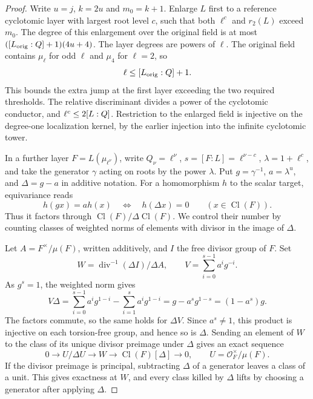\begin{proof}

Write \(u=j\), \(k=2u\) and \(m_0=k+1\).
Enlarge \(L\) first to a reference cyclotomic layer with largest
root level \(c\), such that both \(\ell^c\) and \(r_2(L)\)
exceed \(m_0\). The degree of this enlargement over the
original field is at most \(([L_{\rm orig}:Q]+1)(4u+4)\).
The layer degrees are powers of \(\ell\). The original field
contains \(\mu_\ell\) for odd \(\ell\) and \(\mu_4\) for \(\ell=2\),
so
\[
              \ell\le[L_{\rm orig}:Q]+1 .
\]
This bounds the extra jump at the first layer exceeding the two
required thresholds.
The relative discriminant divides a power of the
cyclotomic conductor, and \(\ell^c\le 2[L:Q]\).
Restriction to the enlarged field is injective on the
degree-one localization kernel, by the earlier injection
into the infinite cyclotomic tower.


In a further layer \(F=L(\mu_{\ell^\nu})\), write
\(Q_\nu=\ell^\nu\), \(s=[F:L]=\ell^{\nu-c}\),
\(\lambda=1+\ell^c\), and take the generator \(\gamma\) acting
on roots by the power \(\lambda\). Put \(g=\gamma^{-1}\),
\(a=\lambda^u\), and \(\Delta=g-a\) in additive notation.
For a homomorphism \(h\) to the scalar target, equivariance reads
\[
 h(gx)=a h(x)\quad\Longleftrightarrow\quad
 h(\Delta x)=0\qquad (x\in\operatorname{Cl}(F)).
\]
Thus it factors through \(\operatorname{Cl}(F)/\Delta\operatorname{Cl}(F)\). We control their number
by counting classes of weighted norms of elements with
divisor in the image of \(\Delta\).

Let \(A=F^\times/\mu(F)\), written additively, and \(I\) the
free divisor group of \(F\). Set
\[
 W=\operatorname{div}^{-1}(\Delta I)/\Delta A,
 \qquad V=\sum_{i=0}^{s-1}a^i g^{-i}.
\]
As \(g^s=1\), the weighted norm gives
\[
 V\Delta=\sum_{i=0}^{s-1}a^ig^{1-i}
              -\sum_{i=1}^{s}a^ig^{1-i}
          =g-a^sg^{1-s}=(1-a^s)g .
\]
The factors commute, so the same holds for \(\Delta V\).
Since \(a^s\ne1\), this product is injective on each
torsion-free group, and hence so is \(\Delta\). Sending an element of \(W\)
to the class of its unique divisor preimage under \(\Delta\)
gives an exact sequence
\[
 0\longrightarrow U/\Delta U\longrightarrow W
      \longrightarrow\operatorname{Cl}(F)[\Delta]\longrightarrow 0,
 \qquad U=\mathcal O_F^\times/\mu(F).
\]
If the divisor preimage is principal, subtracting \(\Delta\)
of a generator leaves a class of a unit. This gives
exactness at \(W\), and every class killed by \(\Delta\)
lifts by choosing a generator after applying \(\Delta\).


\end{proof}
